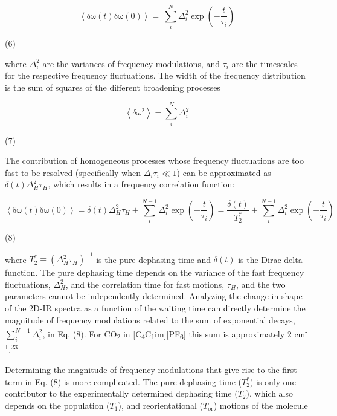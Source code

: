 \documentclass[]{article}
\begin{document}
\[\left\langle \text{δω}\left( t \right)\text{δω}\left( 0 \right) \right\rangle = \ \sum_{i}^{N}{\Delta_{i}^{2}\exp\left( - \frac{t}{\tau_{i}} \right)}\]

(6)

where \(\Delta_{i}^{2}\) are the variances of frequency modulations, and \(\tau_{i}\) are the timescales for the respective frequency fluctuations. The width of the frequency distribution is the sum of squares of the different broadening processes

\[\left\langle \delta\omega^{2} \right\rangle = \sum_{i}^{N}\Delta_{i}^{2}\]

(7)

The contribution of homogeneous processes whose frequency fluctuations are too fast to be resolved (specifically when \(\Delta_{i}\tau_{i} \ll 1\)) can be approximated as \(\delta\left( t \right)\Delta_{H}^{2}\tau_{H}\), which results in a frequency correlation function:

\[\left\langle \text{δω}\left( t \right)\text{δω}\left( 0 \right) \right\rangle = \delta\left( t \right)\Delta_{H}^{2}\tau_{H} + \sum_{i}^{N - 1}{\Delta_{i}^{2}\exp\left( - \frac{t}{\tau_{i}} \right)} = \frac{\delta\left( t \right)}{T_{2}^{*}} + \sum_{i}^{N - 1}{\Delta_{i}^{2}\exp\left( - \frac{t}{\tau_{i}} \right)}\]

(8)

where \(T_{2}^{*} \equiv \left( \Delta_{H}^{2}\tau_{H} \right)^{- 1}\) is the pure dephasing time and \(\delta\left( t \right)\) is the Dirac delta function. The pure dephasing time depends on the variance of the fast frequency fluctuations, \(\Delta_{H}^{2}\), and the correlation time for fast motions, \(\tau_{H}\), and the two parameters cannot be independently determined. Analyzing the change in shape of the 2D-IR spectra as a function of the waiting time can directly determine the magnitude of frequency modulations related to the sum of exponential decays, \(\sum_{i}^{N - 1}\Delta_{i}^{2}\), in Eq. (8). For CO\textsubscript{2} in {[}C\textsubscript{4}C\textsubscript{1}im{]}{[}PF\textsubscript{6}{]} this sum is approximately 2 cm\textsuperscript{-1}.\textsuperscript{23}

Determining the magnitude of frequency modulations that give rise to the first term in Eq. (8) is more complicated. The pure dephasing time (\(T_{2}^{*}\)) is only one contributor to the experimentally determined dephasing time (\(T_{2}\)), which also depends on the population (\(T_{1}\)), and reorientational (\(T_{\text{or}}\)) motions of the molecule
\end{document}
